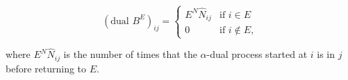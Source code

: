 

$$(\text{dual } B^E)_{ij} = \begin{cases} E^N \hat{N}_{ij} & \text{if } i \in E \\ 0 & \text{if } i \notin E, \end{cases}$$

where $E^N \hat{N}_{ij}$ is the number of times that the $\alpha$-dual process started at $i$ is in $j$ before returning to $E$.
